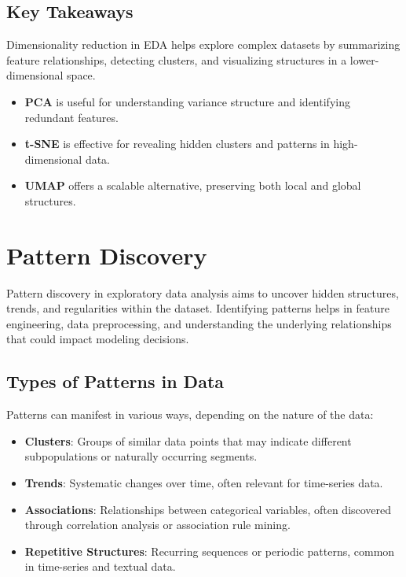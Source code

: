 \documentclass[12pt,openany]{book}
\begin{document}
\subsection{Key Takeaways}

Dimensionality reduction in EDA helps explore complex datasets by summarizing feature relationships, detecting clusters, and visualizing structures in a lower-dimensional space.

\begin{itemize}
    \item \textbf{PCA} is useful for understanding variance structure and identifying redundant features.
    \item \textbf{t-SNE} is effective for revealing hidden clusters and patterns in high-dimensional data.
    \item \textbf{UMAP} offers a scalable alternative, preserving both local and global structures.
\end{itemize}




\section{Pattern Discovery}

Pattern discovery in exploratory data analysis aims to uncover hidden structures, trends, and regularities within the dataset. Identifying patterns helps in feature engineering, data preprocessing, and understanding the underlying relationships that could impact modeling decisions.

\subsection{Types of Patterns in Data}

Patterns can manifest in various ways, depending on the nature of the data:
\begin{itemize}
    \item \textbf{Clusters}: Groups of similar data points that may indicate different subpopulations or naturally occurring segments.
    \item \textbf{Trends}: Systematic changes over time, often relevant for time-series data.
    \item \textbf{Associations}: Relationships between categorical variables, often discovered through correlation analysis or association rule mining.
    \item \textbf{Repetitive Structures}: Recurring sequences or periodic patterns, common in time-series and textual data.
\end{itemize}
\end{document}
